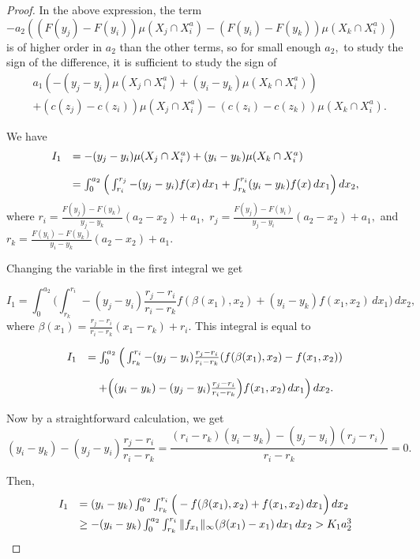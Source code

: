 \documentclass[12pt,reqno]{amsart}
\begin{document}
\begin{proof}
      In the above expression,  the term $-a_2((F(y_j)-F(y_i))\mu( X_j\cap X_i^a)-(F(y_i)-F(y_k))\mu( X_k\cap X_i^a))$ is of higher order in $a_2$ than the other terms, so for small enough $a_2,$ to study the sign of the difference, it is sufficient to study the sign of
      \begin{equation}\label{c eq}\begin{array}{ll}
      &a_1(-(y_j-y_i)\mu( X_j\cap X_i^a)+(y_i-y_k)\mu( X_k\cap X_i^a))\\
      &+(c(z_j)-c(z_i))\mu( X_j\cap X_i^a)-(c(z_i)-c(z_k))\mu( X_k\cap X_i^a).\end{array}\end{equation}

We have \[\begin{array}{ll}
I_1&=-(y_j-y_i)\mu( X_j\cap X_i^a)+(y_i-y_k)\mu( X_k\cap X_i^a)\vspace{10pt}\\
&=\int_0^{a_2}\Big(\int_{r_i}^{r_j}-(y_j-y_i)f(x)\,dx_1+\int_{r_k}^{r_i}(y_i-y_k)f(x)\,dx_1\Big)\,dx_2,
\end{array}\]
 where $r_i=\frac{F(y_j)-F(y_k)}{y_j-y_k}(a_2-x_2)+a_1,$ $r_j=\frac{F(y_j)-F(y_i)}{y_j-y_i}(a_2-x_2)+a_1,$ and $r_k=\frac{F(y_i)-F(y_k)}{y_i-y_k}(a_2-x_2)+a_1.$     

      Changing the variable in the first integral we get 

      \[I_1=\int_0^{a_2}\Big(\int_{r_k}^{r_i}-(y_j-y_i)\frac{r_j-r_i}{r_i-r_k}f(\beta(x_1),x_2)+(y_i-y_k)f(x_1,x_2)\,dx_1\Big)\,dx_2,\]
where $\beta(x_1)=\frac{r_j-r_i}{r_i-r_k}(x_1-r_k)+r_i.$ 
This integral is equal to

 \[\begin{array}{ll}
 I_1&=\int_0^{a_2}\Big(\int_{r_k}^{r_i}-(y_j-y_i)\frac{r_j-r_i}{r_i-r_k}(f(\beta(x_1),x_2)-f(x_1,x_2))\vspace{10pt}\\
 &\quad +\Big((y_i-y_k)-(y_j-y_i)\frac{r_j-r_i}{r_i-r_k}\Big)f(x_1,x_2)\,dx_1\Big)\,dx_2.
 \end{array}\]


Now by a straightforward calculation, we get 
\[(y_i-y_k)-(y_j-y_i)\frac{r_j-r_i}{r_i-r_k}=\frac{(r_i-r_k)(y_i-y_k)-(y_j-y_i)(r_j-r_i)}{r_i-r_k}=0.\]



Then, 
\[\begin{array}{ll}

I_1 &=(y_i-y_k)\int_0^{a_2}\int_{r_k}^{r_i}\Big(-f(\beta(x_1),x_2)+f(x_1,x_2)\,dx_1\Big)\,dx_2\vspace{3pt}\\
&\ge -(y_i-y_k)\int_0^{a_2}\int_{r_k}^{r_i}\|f_{x_1}\|_\infty(\beta(x_1)-x_1)\,dx_1\,dx_2>K_1a_2^3


\end{array}\]
\end{proof}
\end{document}

